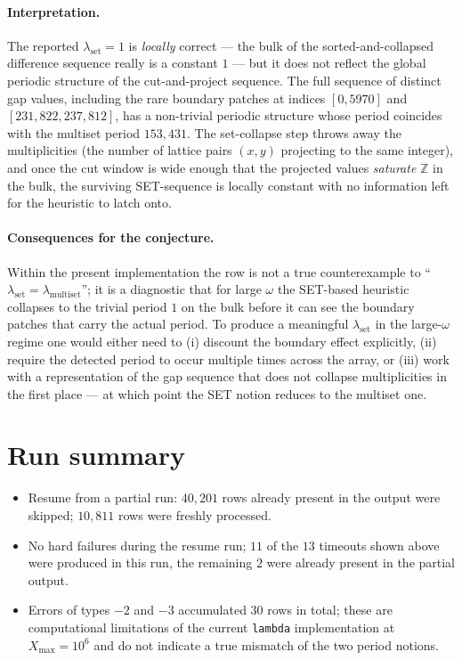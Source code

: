 \documentclass[11pt]{article}
\begin{document}
\paragraph{Interpretation.}
The reported $\lambda_{\text{set}} = 1$ is \emph{locally} correct — the
bulk of the sorted-and-collapsed difference sequence really is a
constant $1$ — but it does not reflect the global periodic structure of
the cut-and-project sequence. The full sequence of distinct gap values,
including the rare boundary patches at indices $[0, 5970]$ and
$[231{,}822, 237{,}812]$, has a non-trivial periodic structure whose
period coincides with the multiset period $153{,}431$. The set-collapse
step throws away the multiplicities (the number of lattice pairs
$(x,y)$ projecting to the same integer), and once the cut window is wide
enough that the projected values \emph{saturate} $\mathbb{Z}$ in the
bulk, the surviving SET-sequence is locally constant with no
information left for the heuristic to latch onto.

\paragraph{Consequences for the conjecture.}
Within the present implementation the row is not a true counterexample
to ``$\lambda_{\text{set}} = \lambda_{\text{multiset}}$''; it is a
diagnostic that for large $\omega$ the SET-based heuristic collapses to
the trivial period $1$ on the bulk before it can see the boundary
patches that carry the actual period. To produce a meaningful
$\lambda_{\text{set}}$ in the large-$\omega$ regime one would either
need to (i) discount the boundary effect explicitly, (ii) require the
detected period to occur multiple times across the array, or (iii) work
with a representation of the gap sequence that does not collapse
multiplicities in the first place — at which point the SET notion
reduces to the multiset one.

\section*{Run summary}

\begin{itemize}
\item Resume from a partial run: $40{,}201$ rows already present in the
      output were skipped; $10{,}811$ rows were freshly processed.
\item No hard failures during the resume run; $11$ of the $13$ timeouts
      shown above were produced in this run, the remaining $2$ were
      already present in the partial output.
\item Errors of types $-2$ and $-3$ accumulated $30$ rows in total;
      these are computational limitations of the current
      \texttt{lambda} implementation at $X_{\max}=10^{6}$ and do not
      indicate a true mismatch of the two period notions.
\end{itemize}
\end{document}
